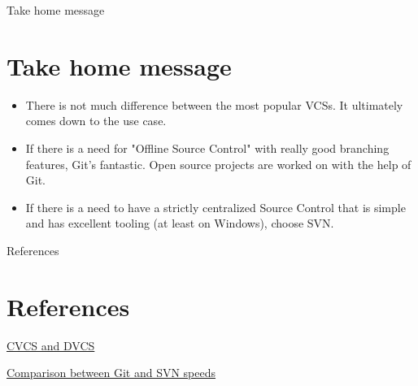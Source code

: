 \documentclass{beamer}
\begin{document}
\begin{frame}{Take home message}
\section{Take home message}
\begin{itemize}
    \item There is not much difference between the most popular VCSs. It ultimately comes down to the use case.
    \item If there is a need for "Offline Source Control" with really good branching features, Git's fantastic. Open source projects are worked on with the help of Git. 
    \item If there is a need to have a strictly centralized Source Control that is simple and has excellent tooling (at least on Windows), choose SVN.
\end{itemize}
    
\end{frame}

\begin{frame}{References}
  \section{References}
    
  \begin{thebibliography}{10}

	\href{https://www.appfusions.com/display/StashSCMImporter/CVCS+vs.+DVCS+In+a+Nutshell
}{CVCS and DVCS}

\href{https://git-scm.com/about/small-and-fast}{Comparison between Git and SVN speeds}


  \end{thebibliography}
\end{frame}
\end{document}
